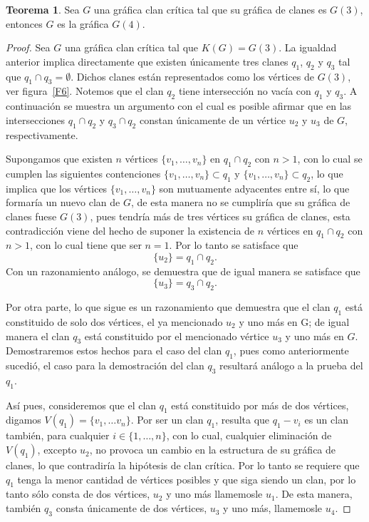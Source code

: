 \documentclass[12pt]{book}
\theoremstyle{definition}
\newtheorem{theorem}{Teorema}[chapter]
\begin{document}
\begin{theorem}\label{T1.12}
Sea $G$ una gráfica clan crítica tal que su gráfica de clanes es $G(3)$, entonces $G$ es la gráfica $G(4)$.
\end{theorem}

\begin{proof}
Sea $G$ una gráfica clan crítica tal que $K(G)=G(3)$. La igualdad anterior implica directamente que existen únicamente tres clanes $q_1$, $q_2$ y $q_3$ tal que $q_1\cap q_3=\emptyset$. Dichos clanes están representados como los vértices de $G(3)$, ver figura~\ref{F6}.
Notemos que el clan $q_2$ tiene intersección no vacía con $q_1$ y $q_3$. A continuación se muestra un argumento con el cual es posible afirmar que en las intersecciones $q_1\cap q_2$ y $q_3\cap q_2$ constan únicamente de un vértice $u_2$ y $u_3$ de $G$, respectivamente.

Supongamos que existen $n$ vértices $\{v_1,\dots,v_n\}$ en $q_1\cap q_2$ con $n>1$, con lo cual se cumplen las siguientes contenciones $\{v_1,\dots,v_n\}\subset q_1 $ y $\{v_1,\dots,v_n\}\subset q_2$, lo que implica que los vértices $\{v_1,\dots,v_n\}$ son mutuamente adyacentes entre sí, lo que formaría un nuevo clan de $G$, de esta manera no se cumpliría que su gráfica de clanes fuese $G(3)$, pues tendría más de tres vértices su gráfica de clanes, esta contradicción viene del hecho de suponer la existencia de $n$ vértices en $q_1\cap q_2$ con $n>1$, con lo cual tiene que ser $n=1$. Por lo tanto se satisface que 
\begin{equation*}
\{u_2\}=q_1\cap q_2.
\end{equation*}
Con un razonamiento análogo, se demuestra que de igual manera se satisface que 
\begin{equation*}
	\{u_3\}=q_3\cap q_2.
\end{equation*}

Por otra parte, lo que sigue es un razonamiento que demuestra que el clan $q_1$ está constituido de solo dos vértices, el ya mencionado $u_2$ y uno más en G; de igual manera el clan $q_3$ está constituido por el mencionado vértice $u_3$ y uno más en $G$. Demostraremos estos hechos para el caso del clan $q_1$, pues como anteriormente sucedió, el caso para la demostración del clan $q_3$ resultará análogo a la prueba del $q_1$. 


Así pues, consideremos que el clan $q_1$ está constituido por más de dos vértices, digamos $V(q_1)=\{v_1,\dots v_n\}$. Por ser un clan $q_1$, resulta que $q_1-v_i$ es un clan también, para cualquier $i\in \{1,\dots,n\}$, con lo cual, cualquier eliminación de $V(q_1)$, excepto $u_2$, no provoca un cambio en la estructura de su gráfica de clanes, lo que contradiría la hipótesis de clan crítica. Por lo tanto se requiere que $q_1$ tenga la menor cantidad de vértices posibles y que siga siendo un clan, por lo tanto sólo consta de dos vértices, $u_2$ y uno más llamemosle $u_1$. De esta manera, también $q_3$ consta únicamente de dos vértices, $u_3$ y uno más, llamemosle $u_4$.


\end{proof}
\end{document}
